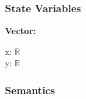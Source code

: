 \documentclass[12pt]{article}
\newcommand{\R}{$\mathbb{R}$}
\begin{document}
\subsubsection{State Variables} \label{SecSVVector}
\textbf{Vector:} 
\begin{multicols}{2}
	\noindent x: \R \\
	y: \R
\end{multicols}



\subsubsection{Semantics} \label{SecAPSVector}
\end{document}
